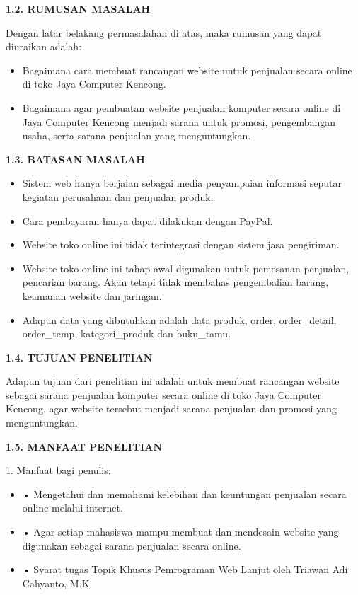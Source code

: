 \documentclass[11pt]{article}
\begin{document}
\textbf{1.2. RUMUSAN MASALAH}

Dengan latar belakang permasalahan di atas, maka rumusan yang dapat diuraikan
adalah:

\begin{itemize}
	\item Bagaimana cara membuat rancangan website untuk penjualan secara online di toko
Jaya Computer Kencong.
	\item Bagaimana agar pembuatan website penjualan komputer secara online di Jaya
Computer Kencong menjadi sarana untuk promosi, pengembangan usaha, serta sarana
penjualan yang menguntungkan.
\end{itemize}

\textbf{1.3. BATASAN MASALAH}

\begin{itemize}
	\item Sistem web hanya berjalan sebagai media penyampaian informasi seputar kegiatan
perusahaan dan penjualan produk.
	\item Cara pembayaran hanya dapat dilakukan dengan PayPal.
	\item 
Website  toko online  ini tidak terintegrasi dengan sistem jasa pengiriman.
	\item Website toko online ini tahap awal digunakan untuk pemesanan penjualan,
pencarian barang. Akan tetapi tidak membahas pengembalian barang, keamanan
website dan jaringan.
	\item Adapun data yang dibutuhkan adalah data produk, order, order\_detail,
order\_temp, kategori\_produk dan buku\_tamu.
\end{itemize}

\textbf{1.4. TUJUAN PENELITIAN}

Adapun tujuan dari penelitian ini adalah untuk membuat rancangan website sebagai sarana penjualan komputer secara online di toko Jaya Computer Kencong, agar website tersebut menjadi sarana penjualan dan promosi yang menguntungkan.

\textbf{1.5. MANFAAT PENELITIAN}

1. Manfaat bagi penulis:

\begin{itemize}
	\item •	Mengetahui dan memahami kelebihan dan keuntungan penjualan secara online melalui  internet.
	\item •	Agar setiap mahasiswa mampu membuat dan mendesain website yang digunakan sebagai sarana penjualan secara online.
	\item •	Syarat tugas Topik Khusus Pemrograman Web Lanjut oleh Triawan Adi Cahyanto, M.K
\end{itemize}
\end{document}
